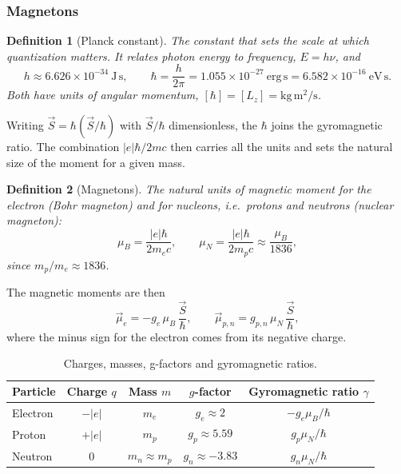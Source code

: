\documentclass{article}
\newtheorem{definition}{Definition}
\begin{document}
\subsubsection{Magnetons}
\begin{definition}[Planck constant]
    The constant that sets the scale at which quantization matters. It relates photon energy to frequency, $E = h\nu$, and
    \[h \approx 6.626 \times 10^{-34}\ \mathrm{J\,s}, \qquad \hbar = \frac{h}{2\pi} = 1.055 \times 10^{-27}\ \mathrm{erg\,s} = 6.582 \times 10^{-16}\ \mathrm{eV\,s}.\]
    Both have units of angular momentum, $[\hbar] = [L_z] = \mathrm{kg\,m^2/s}$.
\end{definition}
Writing $\vec{S} = \hbar(\vec{S}/\hbar)$ with $\vec{S}/\hbar$ dimensionless, the $\hbar$ joins the gyromagnetic ratio. The combination $|e|\hbar/2mc$ then carries all the units and sets the natural size of the moment for a given mass.
\begin{definition}[Magnetons]
    The natural units of magnetic moment for the electron (Bohr magneton) and for nucleons, i.e.\ protons and neutrons (nuclear magneton):
    \begin{equation}
        \mu_{B} = \frac{|e|\hbar}{2m_{e}c}, \qquad \mu_{N} = \frac{|e|\hbar}{2m_{p}c} \approx \frac{\mu_B}{1836},
    \end{equation}
    since $m_{p}/m_{e} \approx 1836$.
\end{definition}
The magnetic moments are then
\begin{equation}
    \vec{\mu}_{e} = -g_{e}\,\mu_{B}\,\frac{\vec{S}}{\hbar}, \qquad \vec{\mu}_{p,n} = g_{p,n}\,\mu_{N}\,\frac{\vec{S}}{\hbar},
\end{equation}
where the minus sign for the electron comes from its negative charge.
\begin{table}[H]
\centering
\begin{tabular}{lcccc}
\hline
Particle & Charge $q$ & Mass $m$ & $g$-factor & Gyromagnetic ratio $\gamma$ \\
\hline
Electron & $-|e|$ & $m_{e}$ & $g_{e} \approx 2$ & $-g_{e}\mu_{B}/\hbar$ \\
Proton   & $+|e|$ & $m_{p}$ & $g_{p} \approx 5.59$ & $g_{p}\mu_{N}/\hbar$ \\
Neutron  & $0$    & $m_{n} \approx m_{p}$ & $g_{n} \approx -3.83$ & $g_{n}\mu_{N}/\hbar$ \\
\hline
\end{tabular}
\caption{Charges, masses, g-factors and gyromagnetic ratios.}
\end{table}
\end{document}

